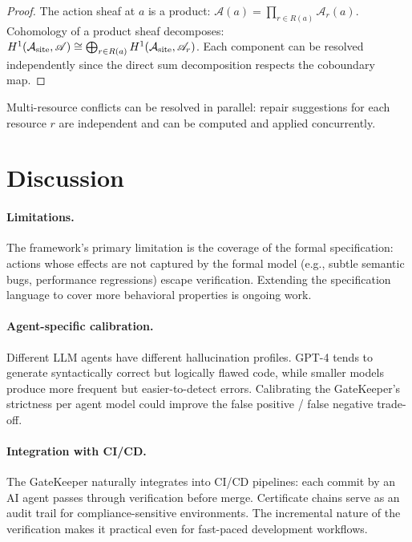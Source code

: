 \documentclass[11pt]{article}
\newcommand{\ActionSite}{\mathcal{A}_{\mathrm{site}}}
\newcommand{\ActionSheaf}{\mathscr{A}}
\begin{document}
\begin{proof}
The action sheaf at $a$ is a product:
$\ActionSheaf(a) = \prod_{r \in R(a)} \ActionSheaf_r(a)$.
Cohomology of a product sheaf decomposes:
$\Hcoh{1}(\ActionSite, \ActionSheaf) \cong
\bigoplus_{r \in R(a)} \Hcoh{1}(\ActionSite, \ActionSheaf_r)$.
Each component can be resolved independently since the direct sum
decomposition respects the coboundary map.
\end{proof}

\begin{corollary}\label{cor:parallel}
Multi-resource conflicts can be resolved in parallel: repair
suggestions for each resource $r$ are independent and can be
computed and applied concurrently.
\end{corollary}


\section{Discussion}\label{sec:discussion}

\paragraph{Limitations.}
The framework's primary limitation is the coverage of the formal
specification: actions whose effects are not captured by the formal
model (e.g., subtle semantic bugs, performance regressions) escape
verification.  Extending the specification language to cover more
behavioral properties is ongoing work.

\paragraph{Agent-specific calibration.}
Different LLM agents have different hallucination profiles.  GPT-4
tends to generate syntactically correct but logically flawed code,
while smaller models produce more frequent but easier-to-detect errors.
Calibrating the GateKeeper's strictness per agent model could improve
the false positive / false negative trade-off.

\paragraph{Integration with CI/CD.}
The GateKeeper naturally integrates into CI/CD pipelines: each commit
by an AI agent passes through verification before merge.  Certificate
chains serve as an audit trail for compliance-sensitive environments.
The incremental nature of the verification makes it practical even
for fast-paced development workflows.
\end{document}
